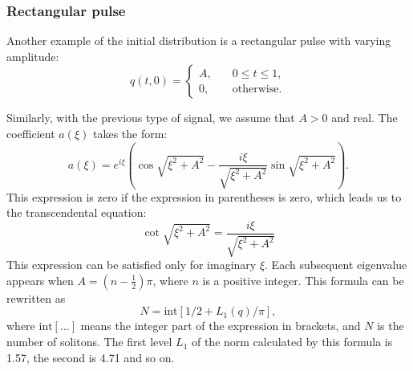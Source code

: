 \subsubsection{Rectangular pulse}

Another example of the initial distribution is a rectangular pulse with varying amplitude:
\begin{equation}
    q(t, 0) = \left\{
    \begin{aligned}
        A {,}& \quad 0 \leq t \leq 1 {,} \\
        0 {,}& \quad \text{otherwise} {.}
    \end{aligned} \right.
\end{equation}

Similarly, with the previous type of signal, we assume that $ A> 0 $ and real. The coefficient $ a (\xi) $ takes the form:
\begin{equation}
    a(\xi) = e^{i\xi} \left( \cos \sqrt{\xi^2 + A^2} - \frac{i\xi}{\sqrt{\xi^2 + A^2}}\sin \sqrt{\xi^2 + A^2} \right) {.}
\end{equation}
This expression is zero if the expression in parentheses is zero, which leads us to the transcendental equation:
\begin{equation}
    \cot \sqrt{\xi^2 + A^2} = \frac{i\xi}{\sqrt{\xi^2 + A^2}}
\end{equation}
This expression can be satisfied only for imaginary $ \xi $. Each subsequent eigenvalue appears when $ A = (n - \frac{1}{2}) \pi $, where $n$ is a positive integer. This formula can be rewritten as
\begin{equation}
    N = \mathrm{int}[1/2 + L_1(q)/\pi] {,}
    \label{eq:n_soliton_l1}
\end{equation}
where $ \mathrm{int} [...] $ means the integer part of the expression in brackets, and $N$ is the number of solitons.
The first level $L_1$ of the norm calculated by this formula is 1.57, the second is 4.71 and so on.

 

